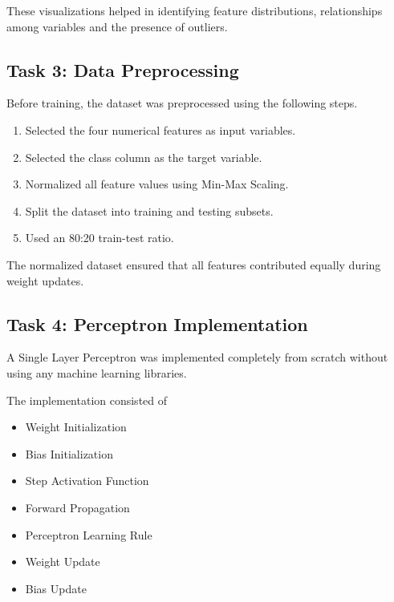 \documentclass[11pt,a4paper]{article}
\begin{document}
These visualizations helped in identifying feature distributions, relationships among variables and the presence of outliers.



\subsection*{Task 3: Data Preprocessing}

Before training, the dataset was preprocessed using the following steps.

\begin{enumerate}
\item Selected the four numerical features as input variables.
\item Selected the class column as the target variable.
\item Normalized all feature values using Min-Max Scaling.
\item Split the dataset into training and testing subsets.
\item Used an 80:20 train-test ratio.
\end{enumerate}

\vspace{0.3cm}

The normalized dataset ensured that all features contributed equally during weight updates.



\subsection*{Task 4: Perceptron Implementation}

A Single Layer Perceptron was implemented completely from scratch without using any machine learning libraries.

The implementation consisted of

\begin{itemize}
\item Weight Initialization
\item Bias Initialization
\item Step Activation Function
\item Forward Propagation
\item Perceptron Learning Rule
\item Weight Update
\item Bias Update
\end{itemize}
\end{document}
